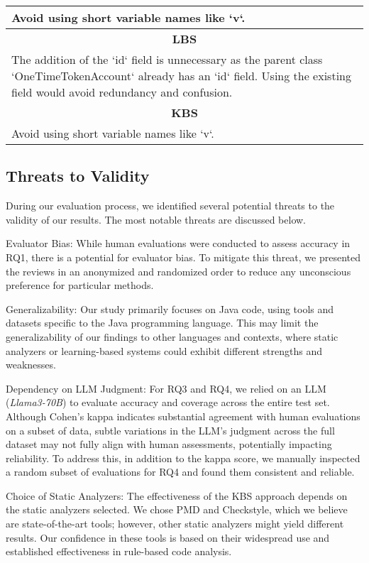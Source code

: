 \begin{table*}[!htbp]
\begin{tabularx}{1\linewidth}{X}
Avoid using short variable names like `v`. 

\\ \midrule
\multicolumn{1}{c}{\textbf{LBS}} \\ \midrule
The addition of the `id` field is unnecessary as the parent class `OneTimeTokenAccount` already has an `id` field. Using the existing field would avoid redundancy and confusion.
\\ \midrule
\multicolumn{1}{c}{\textbf{KBS}} \\ \midrule
Avoid using short variable names like `v`. 
\\ \bottomrule

\end{tabularx}
\end{table*}


\subsection{Threats to Validity}
During our evaluation process, we identified several potential threats to the validity of our results. The most notable threats are discussed below.

Evaluator Bias: While human evaluations were conducted to assess accuracy in RQ1, there is a potential for evaluator bias. To mitigate this threat, we presented the reviews in an anonymized and randomized order to reduce any unconscious preference for particular methods.

Generalizability: Our study primarily focuses on Java code, using tools and datasets specific to the Java programming language. This may limit the generalizability of our findings to other languages and contexts, where static analyzers or learning-based systems could exhibit different strengths and weaknesses.

Dependency on LLM Judgment: For RQ3 and RQ4, we relied on an LLM (\emph{Llama3-70B}) to evaluate accuracy and coverage across the entire test set. Although Cohen’s kappa indicates substantial agreement with human evaluations on a subset of data, subtle variations in the LLM's judgment across the full dataset may not fully align with human assessments, potentially impacting reliability. To address this, in addition to the kappa score, we manually inspected a random subset of evaluations for RQ4 and found them consistent and reliable.

Choice of Static Analyzers: The effectiveness of the KBS approach depends on the static analyzers selected. We chose PMD and Checkstyle, which we believe are state-of-the-art tools; however, other static analyzers might yield different results. Our confidence in these tools is based on their widespread use and established effectiveness in rule-based code analysis.

